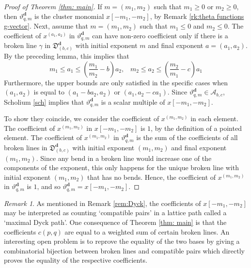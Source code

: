 \documentclass[11pt]{amsart}
\newcommand{\saySS}[1]{\say[SS]{#1}}
\theoremstyle{remark}
\newtheorem{remark}[theorem]{Remark}
\numberwithin{equation}{section}
\begin{document}
\begin{proof}[Proof of Theorem \ref{thm: main}]

If $m=(m_1,m_2)$ such that $m_1\geq0$ or $m_2\geq0$, then $\vartheta_{q,m}^\mathbf{d}$ is the cluster monomial $x[-m_1,-m_2]$, by Remark \ref{rk:theta functions g-vector}.
Next, assume that $m=(m_1,m_2)$ such that $m_1\leq0$ and $m_2\leq0$.
The coefficient of $x^{(a_1,a_2)}$ in $\vartheta_{q,m}^\mathbf{d}$ can have non-zero coefficient only if there is a broken line $\gamma$ in $\mathfrak{D}^\mathbf{d}_{(b,c)}$ with initial exponent $m$ and final exponent $a=(a_1,a_2)$.  By the preceding lemma, this implies that 
\[ m_1\leq a_1\leq \left(\frac{m_1}{m_2}-b\right)a_2,\;\;\; m_2\leq a_2\leq \left(\frac{m_2}{m_1}-c\right)a_1\]
Furthermore, the upper bounds are only satisfied in the specific cases when $(a_1,a_2)$ is equal to $(a_1-ba_2,a_2)$ or $(a_1,a_2-ca_1)$.  
Since $\vartheta_{q,m}^\mathbf{d}\in \mathcal{A}_{b,c}$, Scholium \ref{sch} implies that $\vartheta_{q,m}^\mathbf{d}$ is a scalar multiple of $x[-m_1,-m_2]$. 

To show they coincide, we consider the coefficient of $x^{(m_1,m_2)}$ in each element.  The coefficient of $x^{(m_1,m_2)}$ in $x[-m_1,-m_2]$ is $1$, by the definition of a pointed element. The coefficient of $x^{(m_1,m_2)}$ in $\vartheta_{q,m}^\mathbf{d}$ is the sum of the coefficients of all broken lines in $\mathfrak{D}_{(b,c)}^\mathbf{d}$ with initial exponent $(m_1,m_2)$ and final exponent $(m_1,m_2)$.  Since any bend in a broken line would increase one of the components of the exponent, this only happens for the unique broken line with initial exponent $(m_1,m_2)$ that has no bends. Hence, the coefficient of $x^{(m_1,m_2)}$ in $\vartheta_{q,m}^\mathbf{d}$ is $1$, and so $\vartheta_{q,m}^\mathbf{d}=x[-m_1,-m_2]$.
\end{proof}

\begin{remark}
As mentioned in Remark \ref{rem:Dyck}, the coefficients of $x[-m_1,-m_2]$ may be interpreted as counting `compatible pairs' in a lattice path called a `maximal Dyck path'.  One consequence of Theorem \ref{thm: main} is that the coefficients $c(p,q)$ are equal to a weighted sum of certain broken lines.  An interesting open problem is to reprove the equality of the two bases by giving a combinatorial bijection between broken lines and compatible pairs which directly proves the equality of the respective coefficients.
\end{remark}
\end{document}
